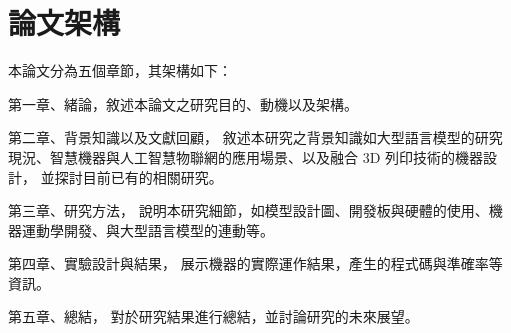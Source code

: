\documentclass[class=NCU_thesis, crop=false]{standalone}
\begin{document}
\section{論文架構}
本論文分為五個章節，其架構如下：

第一章、緒論，敘述本論文之研究目的、動機以及架構。

第二章、背景知識以及文獻回顧，
敘述本研究之背景知識如大型語言模型的研究現況、智慧機器與人工智慧物聯網的應用場景、以及融合 3D 列印技術的機器設計，
並探討目前已有的相關研究。

第三章、研究方法，
說明本研究細節，如模型設計圖、開發板與硬體的使用、機器運動學開發、與大型語言模型的連動等。

第四章、實驗設計與結果，
展示機器的實際運作結果，產生的程式碼與準確率等資訊。

第五章、總結，
對於研究結果進行總結，並討論研究的未來展望。
\end{document}
